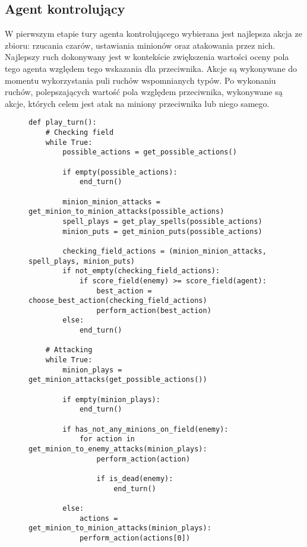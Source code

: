 \subsection{Agent kontrolujący}

W pierwszym etapie tury agenta kontrolującego wybierana jest najlepsza akcja ze zbioru: rzucania czarów, ustawiania minionów oraz atakowania przez nich. Najlepszy ruch dokonywany jest w kontekście zwiększenia wartości oceny pola tego agenta względem tego wskazania dla przeciwnika. Akcje są wykonywane do momentu wykorzystania puli ruchów wspomnianych typów. Po wykonaniu ruchów, polepszających wartość pola względem przeciwnika, wykonywane są akcje, których celem jest atak na miniony przeciwnika lub niego samego.

\begin{figure}[H]
	\begin{verbatim}
def play_turn():
	# Checking field
	while True:
		possible_actions = get_possible_actions()
		
		if empty(possible_actions):
			end_turn()
	
		minion_minion_attacks = get_minion_to_minion_attacks(possible_actions)
		spell_plays = get_play_spells(possible_actions)
		minion_puts = get_minion_puts(possible_actions)
		
		checking_field_actions = (minion_minion_attacks, spell_plays, minion_puts)
		if not_empty(checking_field_actions):
			if score_field(enemy) >= score_field(agent):
				best_action = choose_best_action(checking_field_actions)
				perform_action(best_action)
		else:
			end_turn()
			
	# Attacking
	while True:
		minion_plays = get_minion_attacks(get_possible_actions())
		
		if empty(minion_plays):
			end_turn()
	
		if has_not_any_minions_on_field(enemy):
			for action in get_minion_to_enemy_attacks(minion_plays):
				perform_action(action)
			
				if is_dead(enemy):
					end_turn()
					
		else:
			actions = get_minion_to_minion_attacks(minion_plays):
			perform_action(actions[0])
			
	\end{verbatim}
\end{figure}